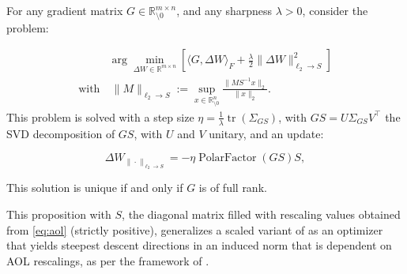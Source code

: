     
    \begin{proposition}
    For any gradient matrix $G \in \mathbb{R}^{m \times n}_{\setminus 0}$, and any sharpness $\lambda > 0$, consider the problem:
        
        \begin{equation}
        \begin{aligned}
            & \arg \min_{\Delta W \in \mathbb{R}^{m \times n}} \left[  \langle G, \Delta W \rangle_F + \frac{\lambda}{2} \| \Delta W \|_{\ell_2 \rightarrow S}^2 \right] \\
             \text{with} & \ \| M \|_{\ell_2 \rightarrow S} := \sup_{x \in \mathbb{R}^{n}_{\setminus 0}} \frac{\| M S^{-1} x \|_2}{\| x\|_2}.
        \end{aligned}
        \end{equation}
        \noindent This problem is solved with a step size $\eta = \frac{1}{\lambda} \operatorname{tr}(\Sigma_{GS})$, with $GS=U \Sigma_{GS} V^\top$ the SVD decomposition of $GS$, with $U$ and $V$ unitary,  and an update:
    
        \begin{equation}
            \Delta W_{\| \cdot \|_{\ell_2 \rightarrow S}} = -\eta \operatorname{PolarFactor}(G S) S,
        \end{equation}
    
        \noindent This solution is unique if and only if $G$ is of full rank. %

    \end{proposition}
    
    This proposition with $S$, the diagonal matrix filled with rescaling values obtained from \cref{eq:aol} (strictly positive),  generalizes a scaled variant of \turbomuon as an optimizer that yields steepest descent directions in an induced norm that is dependent on AOL rescalings, as per the framework of \cite{bernstein2024oldoptimizernewnorm}.
    
